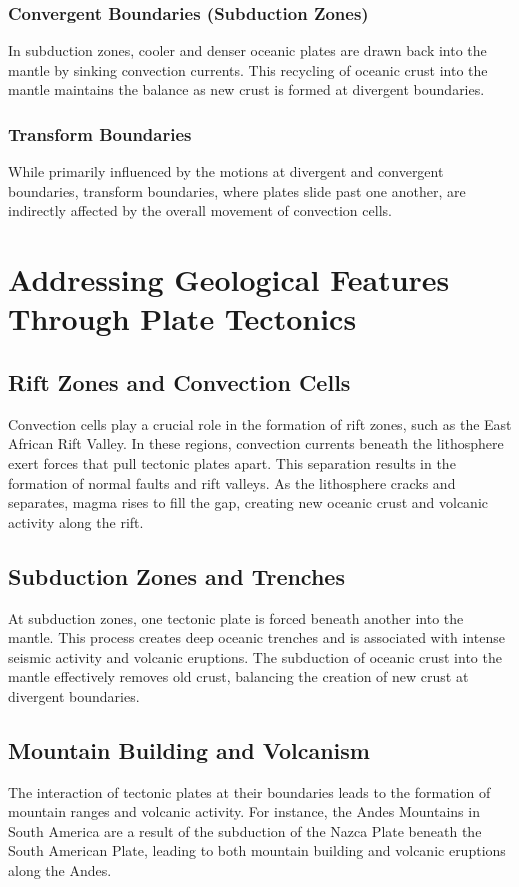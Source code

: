 \documentclass{article}
\begin{document}
\subsubsection{Convergent Boundaries (Subduction Zones)}
In subduction zones, cooler and denser oceanic plates are drawn back into the mantle by sinking convection currents. This recycling of oceanic crust into the mantle maintains the balance as new crust is formed at divergent boundaries.

\subsubsection{Transform Boundaries}
While primarily influenced by the motions at divergent and convergent boundaries, transform boundaries, where plates slide past one another, are indirectly affected by the overall movement of convection cells.

\section{Addressing Geological Features Through Plate Tectonics}

\subsection{Rift Zones and Convection Cells}
Convection cells play a crucial role in the formation of rift zones, such as the East African Rift Valley. In these regions, convection currents beneath the lithosphere exert forces that pull tectonic plates apart. This separation results in the formation of normal faults and rift valleys. As the lithosphere cracks and separates, magma rises to fill the gap, creating new oceanic crust and volcanic activity along the rift.

\subsection{Subduction Zones and Trenches}
At subduction zones, one tectonic plate is forced beneath another into the mantle. This process creates deep oceanic trenches and is associated with intense seismic activity and volcanic eruptions. The subduction of oceanic crust into the mantle effectively removes old crust, balancing the creation of new crust at divergent boundaries.

\subsection{Mountain Building and Volcanism}
The interaction of tectonic plates at their boundaries leads to the formation of mountain ranges and volcanic activity. For instance, the Andes Mountains in South America are a result of the subduction of the Nazca Plate beneath the South American Plate, leading to both mountain building and volcanic eruptions along the Andes.
\end{document}
